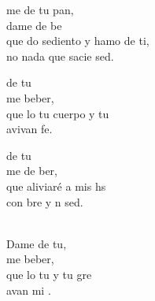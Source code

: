 \begin{cancion}%
	me de tu pan,\\
	dame de be \\
	que do sediento y hamo de ti,\\
	no  nada que sacie  sed.\jump\\
	\begin{chorus}%
		de tu  \\
		me  beber,\\
		que lo tu cuerpo y tu    \\
		avivan  fe.\jump\\
	\end{chorus}%
	de tu  \\
	me de ber,\\
	que  aliviaré a mis hs\\
	con bre y n sed.\\
	\jumjump\\
	\begin{chorus}%
		Dame de tu\chord{fa}{m}{ pan},\\
		me  beber,\\
		que lo tu  y tu gre\\
		avan mi .\jump\\
	\end{chorus}%
	\jump
	\jump
	\jump
\end{cancion}%
